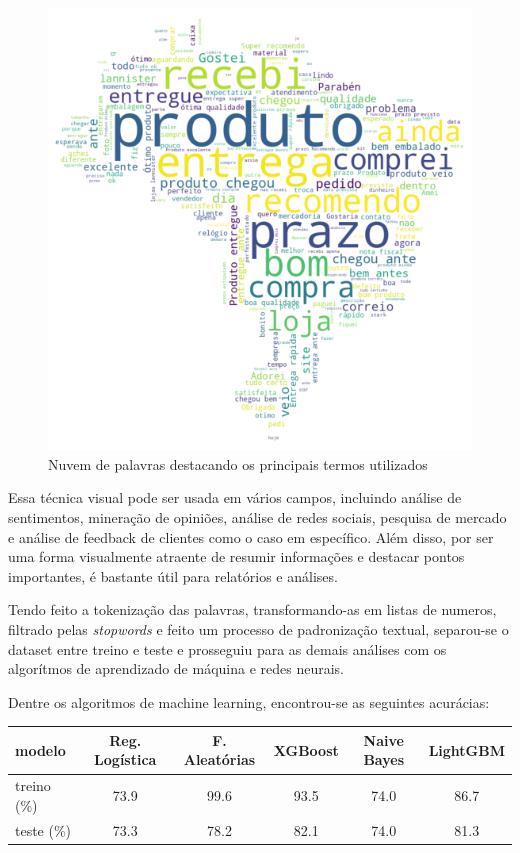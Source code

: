 \begin{figure}[H]
    \centering
    \includegraphics[scale=0.8]{./figs/word_cloud.png}
    \caption{Nuvem de palavras destacando os principais termos utilizados}
    \label{fig:wordCloud}
\end{figure}

Essa técnica visual pode ser usada em vários campos, incluindo análise de sentimentos, mineração de opiniões, análise de redes sociais, pesquisa de mercado e análise de feedback de clientes como o caso em específico. Além disso, por ser uma forma visualmente atraente de resumir informações e destacar pontos importantes, é bastante útil para relatórios e análises.

Tendo feito a tokenização das palavras, transformando-as em listas de numeros, filtrado pelas \textit{stopwords} e feito um processo de padronização textual, separou-se o dataset entre treino e teste e prosseguiu para as demais análises com os algorítmos de aprendizado de máquina e redes neurais.

Dentre os algoritmos de machine learning, encontrou-se as seguintes acurácias:

\begin{table}[H]
    \centering
    \begin{tabular}{l|ccccc}
        \hline
        { modelo}      & { Reg. Logística} & { F. Aleatórias} & { XGBoost} & { Naive Bayes} & LightGBM \\ \hline\hline
        { treino (\%)} & { 73.9}           & { 99.6}          & { 93.5}    & { 74.0}        & 86.7     \\\hline
        { teste (\%)}  & { 73.3}           & { 78.2}          & { 82.1}    & { 74.0}        & 81.3
    \end{tabular}
\end{table}

